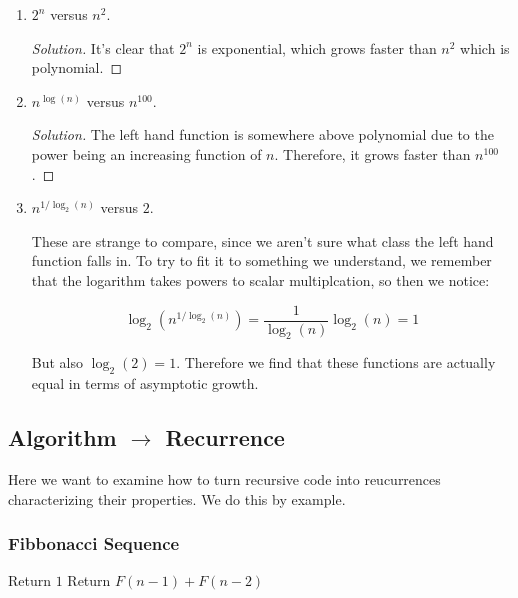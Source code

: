 \begin{enumerate}[(1)]

\item $2^n$ versus $n^2$.

\begin{proof}[Solution]

It's clear that $2^n$ is exponential, which grows faster than $n^2$ which is
polynomial.

\end{proof}

\item $n^{\log(n)}$ versus $n^{100}$.

\begin{proof}[Solution]

The left hand function is somewhere above polynomial due to the power being an
increasing function of $n$. Therefore, it grows faster than $n^{100}$.

\end{proof}

\item $n^{1/\log_2(n)}$ versus $2$.

These are strange to compare, since we aren't sure what class the left hand
function falls in. To try to fit it to something we understand, we remember that
the logarithm takes powers to scalar multiplcation, so then we notice:

$$
\log_2(n^{1/\log_2(n)}) = \frac{1}{\log_2(n)} \log_2(n) = 1
$$

But also $\log_2(2) = 1$. Therefore we find that these functions are actually
equal in terms of asymptotic growth.

\end{enumerate}


\subsection{Algorithm $\to$ Recurrence}

Here we want to examine how to turn recursive code into reucurrences
characterizing their properties. We do this by example.

\subsubsection{Fibbonacci Sequence}

\begin{algorithmic}[1]
		\State Return $1$
	\Else
		\State Return $F(n-1)+F(n-2)$
	\EndIf
\EndProcedure
\end{algorithmic}

